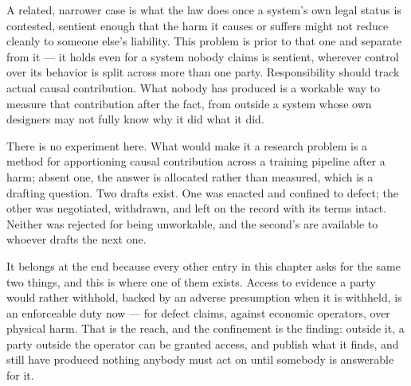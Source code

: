 A related, narrower case is what the law does once a system's own legal status is contested, sentient enough that the harm it causes or suffers might not reduce cleanly to someone else's liability. This problem is prior to that one and separate from it — it holds even for a system nobody claims is sentient, wherever control over its behavior is split across more than one party. Responsibility should track actual causal contribution. What nobody has produced is a workable way to measure that contribution after the fact, from outside a system whose own designers may not fully know why it did what it did.

There is no experiment here. What would make it a research problem is a method for apportioning causal contribution across a training pipeline after a harm; absent one, the answer is allocated rather than measured, which is a drafting question. Two drafts exist. One was enacted and confined to defect; the other was negotiated, withdrawn, and left on the record with its terms intact. Neither was rejected for being unworkable, and the second's are available to whoever drafts the next one.

It belongs at the end because every other entry in this chapter asks for the same two things, and this is where one of them exists. Access to evidence a party would rather withhold, backed by an adverse presumption when it is withheld, is an enforceable duty now — for defect claims, against economic operators, over physical harm. That is the reach, and the confinement is the finding: outside it, a party outside the operator can be granted access, and publish what it finds, and still have produced nothing anybody must act on until somebody is answerable for it.
